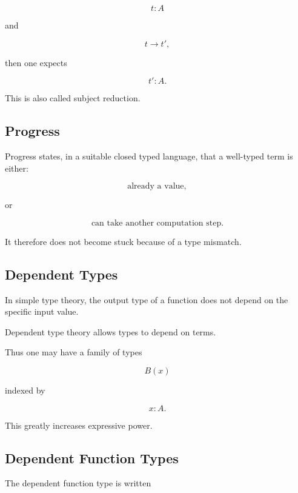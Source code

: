 \[
\boxed{
t:A
}
\]

and

\[
\boxed{
t\longrightarrow t',
}
\]

then one expects

\[
\boxed{
t':A.
}
\]

This is also called subject reduction.

\subsection{Progress}
\label{subsec:type-progress}

Progress states, in a suitable closed typed language, that a well-typed term
is either:

\[
\boxed{
\text{already a value},
}
\]

or

\[
\boxed{
\text{can take another computation step}.
}
\]

It therefore does not become stuck because of a type mismatch.

\subsection{Dependent Types}
\label{subsec:dependent-types}

In simple type theory, the output type of a function does not depend on the
specific input value.

Dependent type theory allows types to depend on terms.

Thus one may have a family of types

\[
\boxed{
B(x)
}
\]

indexed by

\[
x:A.
\]

This greatly increases expressive power.

\subsection{Dependent Function Types}
\label{subsec:dependent-function-types}

The dependent function type is written

